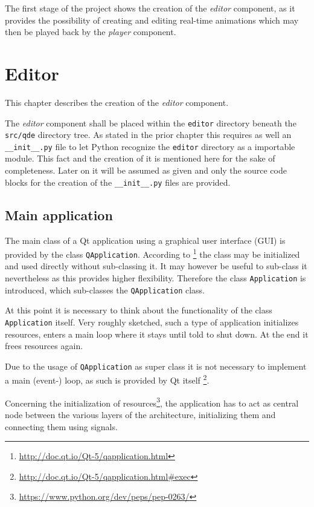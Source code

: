 \documentclass[10pt, openright, notitlepage]{scrreprt}
\begin{document}
The first stage of the project shows the creation of the \emph{editor} component, as
it provides the possibility of creating and editing real-time animations which
may then be played back by the \emph{player} component\cite[p. 29]{osterwalder_qde_2016}.

\section{Editor}
\label{sec:org5ebd349}

This chapter describes the creation of the \emph{editor} component.

The \emph{editor} component shall be placed within the \texttt{editor} directory beneath the
\texttt{src/qde} directory tree. As stated in the prior chapter this requires as well
an \texttt{\_\_init\_\_.py} file to let Python recognize the \texttt{editor} directory as a
importable module. This fact and the creation of it is mentioned here for the
sake of completeness. Later on it will be assumed as given and only the source
code blocks for the creation of the \texttt{\_\_init\_\_.py} files are provided.

\subsection{Main application}
\label{sec:org70323bc}

The main class of a Qt application using a graphical user interface (GUI)
is provided by the class \texttt{QApplication}. According to
\footnote{\url{http://doc.qt.io/Qt-5/qapplication.html}} the class may be initialized and
used directly without sub-classing it. It may however be useful to sub-class it
nevertheless as this provides higher flexibility. Therefore the class
\texttt{Application} is introduced, which sub-classes the \texttt{QApplication} class.

At this point it is necessary to think about the functionality of the class
\texttt{Application} itself. Very roughly sketched, such a type of application
initializes resources, enters a main loop where it stays until told to shut
down. At the end it frees resources again.

Due to the usage of \texttt{QApplication} as super class it is not necessary to
implement a main (event-) loop, as such is provided by Qt itself
\footnote{\url{http://doc.qt.io/Qt-5/qapplication.html\#exec}}.

Concerning the initialization of
resources\footnote{\url{https://www.python.org/dev/peps/pep-0263/}}, the application has
to act as central node between the various layers of the architecture,
initializing them and connecting them using signals.\cite[S. 37 bis 38]{osterwalder_qde_2016}
\end{document}
